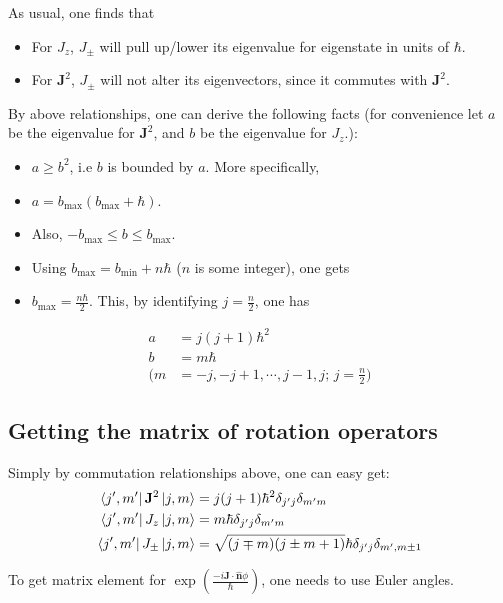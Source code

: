 \documentclass{article}
\numberwithin{equation}{subsection} %
\theoremstyle{definition}
\begin{document}
As usual, one finds that
\begin{itemize}
    \item For $J_z$, $J_\pm$ will pull up/lower its eigenvalue for
        eigenstate in units of $\hbar$.
    \item For $\mathbf{J}^2$, $J_\pm$ will not alter its eigenvectors,
        since it commutes with $\mathbf{J}^2$.
\end{itemize} 
By above relationships, one can derive the following facts (for
convenience let $a$ be the eigenvalue for $\mathbf{J}^2$, and $b$ be the
eigenvalue for $J_z$.):
\begin{itemize}
    \item $a\geq b^2$, i.e $b$ is bounded by $a$. More specifically,
    \item $a=b_{\text{max}}(b_{\text{max}}+\hbar)$.
    \item Also, $-b_{\text{max}}\leq b \leq b_{\text{max}}$.
    \item Using $b_{\text{max}}=b_{\text{min}}+n\hbar$ ($n$ is some
        integer), one gets
    \item $b_{\text{max}}= \frac{n\hbar}{2}$. This, by identifying
        $j=\frac{n}{2}$, one has
\end{itemize}
\begin{align}
    a &= j(j+1)\hbar^2 \\
    b &= m\hbar\\
    (m &= -j, -j+1,\cdots, j-1,j;\, j=\frac{n}{2}) \nonumber
\end{align}
\subsection{Getting the matrix of rotation operators}
\label{sec:Using-Euler-angles-to-get-matrix-of-rotation-operators}

Simply by commutation relationships above, one can easy get:
\begin{align}
    \bra{j',m'}\mathbf{J}^2\ket{j,m} &= 
        j(j+1)\hbar^2 \delta_{j'j}\delta_{m'm} \\
    \bra{j',m'}J_z\ket{j,m} &= 
        m\hbar \delta_{j'j}\delta_{m'm} \\
    \bra{j',m'}J_\pm\ket{j,m} &= 
        \sqrt{(j\mp m)(j\pm m+1)} \hbar \delta_{j'j}\delta_{m',m\pm 1}
        \label{eq:revSpin.getMatRot.J_pm}
\end{align}

To get matrix element for
$\exp(\frac{-i\mathbf{J}\cdot\hat{\mathbf{n}}\phi}{\hbar})$, one needs to
use Euler angles.
\end{document}
